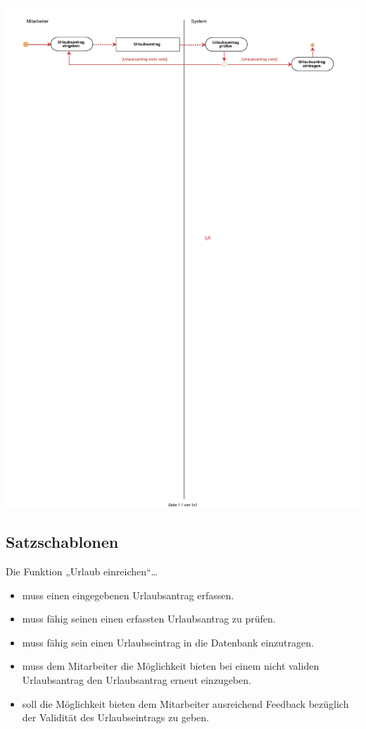 \begin{center}
	\includegraphics[width=0.9\linewidth]{Urlaub_einreichen.pdf}
\end{center}

\subsection{Satzschablonen}
Die Funktion „Urlaub einreichen“…
\begin{itemize}
\item muss einen eingegebenen Urlaubsantrag erfassen.
\item muss fähig seinen einen erfassten Urlaubsantrag zu prüfen.
\item muss fähig sein einen Urlaubseintrag in die Datenbank einzutragen.
\item muss dem Mitarbeiter die Möglichkeit bieten bei einem nicht validen Urlaubsantrag den Urlaubsantrag erneut einzugeben.
\item soll die Möglichkeit bieten dem Mitarbeiter ausreichend Feedback bezüglich der Validität des Urlaubseintrags zu geben.
\end{itemize}

